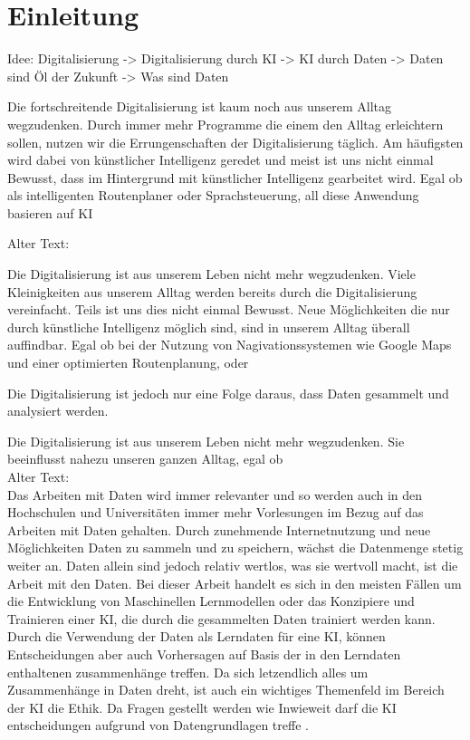 \chapter{Einleitung}
    \label{sec:einleitung}
    Idee:
    Digitalisierung -> Digitalisierung durch KI -> KI durch Daten -> Daten sind Öl der Zukunft -> Was sind Daten
    
    Die fortschreitende Digitalisierung ist kaum noch aus unserem Alltag wegzudenken. Durch immer mehr Programme die einem den Alltag erleichtern sollen, nutzen wir die Errungenschaften der Digitalisierung täglich. Am häufigsten wird dabei von künstlicher Intelligenz geredet und meist ist uns nicht einmal Bewusst, dass im Hintergrund mit künstlicher Intelligenz gearbeitet wird. Egal ob als intelligenten Routenplaner oder Sprachsteuerung, all diese Anwendung basieren auf \ac{KI}


    Alter Text:
    
    Die Digitalisierung ist aus unserem Leben nicht mehr wegzudenken. Viele Kleinigkeiten aus unserem Alltag werden bereits durch die Digitalisierung vereinfacht. Teils ist uns dies nicht einmal Bewusst. Neue Möglichkeiten die nur durch künstliche Intelligenz möglich sind, sind in unserem Alltag überall auffindbar. Egal ob bei der Nutzung von Nagivationssystemen wie Google Maps und einer optimierten Routenplanung, oder 

    Die Digitalisierung ist jedoch nur eine Folge daraus, dass Daten gesammelt und analysiert werden. 
    
    Die Digitalisierung ist aus unserem Leben nicht mehr wegzudenken. Sie beeinflusst nahezu unseren ganzen Alltag, egal ob
    \\
    Alter Text:
    \\
    Das Arbeiten mit Daten wird immer relevanter und so werden auch in den Hochschulen und Universitäten immer mehr Vorlesungen im Bezug auf das Arbeiten mit Daten gehalten. Durch zunehmende Internetnutzung und neue Möglichkeiten Daten zu sammeln und zu speichern, wächst die Datenmenge stetig weiter an. Daten allein sind jedoch relativ wertlos, was sie wertvoll macht, ist die Arbeit mit den Daten. Bei dieser Arbeit handelt es sich in den meisten Fällen um die Entwicklung von Maschinellen Lernmodellen oder das Konzipiere und Trainieren einer \ac{KI}, die durch die gesammelten Daten trainiert werden kann. Durch die Verwendung der Daten als Lerndaten für eine \ac{KI}, können Entscheidungen aber auch Vorhersagen auf Basis der in den Lerndaten enthaltenen zusammenhänge treffen. Da sich letzendlich alles um Zusammenhänge in Daten dreht, ist auch ein wichtiges Themenfeld im Bereich der \ac{KI} die Ethik. Da Fragen gestellt werden wie \dq Inwieweit darf die \ac{KI} entscheidungen aufgrund von Datengrundlagen treffe \dq. \cite{dullien2018}

